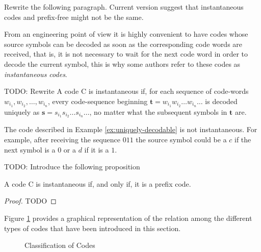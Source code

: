 {\color{red} Rewrite the following paragraph. Current version suggest that instantaneous codes and prefix-free might not be the same.}

From an engineering point of view it is highly convenient to have codes whose source symbols can be decoded as soon as the corresponding code words are received, that is, it is not necessary to wait for the next code word in order to decode the current symbol, this is why some authors refer to these codes as \emph{instantaneous codes}.

\begin{definition}
{\color{red} TODO: Rewrite} A code C is instantaneous if, for each sequence of code-words $w_{i_{1}},w_{i_{2}},\ldots,w_{i_{n}}$, every code-sequence beginning $\mathbf{t}=w_{i_{1}}w_{i_{2}}\ldots w_{i_{n}}\ldots$ is decoded uniquely as $\mathbf{s}=s_{i_{1}}s_{i_{2}}\ldots s_{i_{n}}\ldots$, no matter what the subsequent symbols in $\mathbf{t}$ are.
\end{definition}

\begin{example}
The code described in Example \ref{ex:uniquely-decodable} is not instantaneous. For example, after receiving the sequence $011$ the source symbol could be a $c$ if the next symbol is a $0$ or a $d$ if it is a $1$.
\end{example}

{\color{red} TODO: Introduce the following proposition}

\begin{proposition}
A code C is instantaneous if, and only if, it is a prefix code.
\end{proposition}
\begin{proof}
{\color{red} TODO}
\end{proof}

Figure \ref{fig:Classification-Codes} provides a graphical representation of the relation among the different types of codes that have been introduced in this section.

\begin{figure}[t]
\centering
{}
\caption{\label{fig:Classification-Codes}Classification of Codes}
\end{figure}


